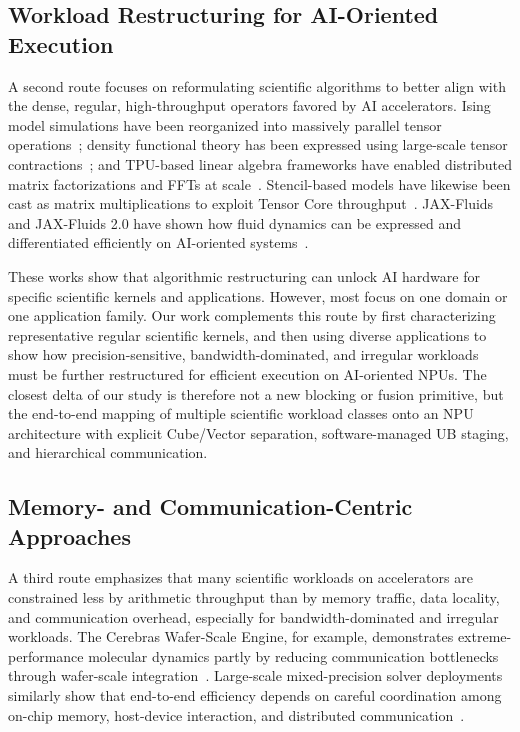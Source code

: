 \documentclass{article}
\newcommand{\rev}[1]{#1}
\begin{document}
\subsection{Workload Restructuring for AI-Oriented Execution}

A second route focuses on reformulating scientific algorithms to better align with the dense, regular, high-throughput operators favored by AI accelerators. Ising model simulations have been reorganized into massively parallel tensor operations~\cite{yang2019high}; density functional theory has been expressed using large-scale tensor contractions~\cite{pederson2023large}; and TPU-based linear algebra frameworks have enabled distributed matrix factorizations and FFTs at scale~\cite{lewis2022large}. Stencil-based models have likewise been cast as matrix multiplications to exploit Tensor Core throughput~\cite{ROMERO2020107473}. JAX-Fluids and JAX-Fluids 2.0 have shown how fluid dynamics can be expressed and differentiated efficiently on AI-oriented systems~\cite{Bezgin2023, Bezgin2025}.

These works show that algorithmic restructuring can unlock AI hardware for specific scientific kernels and applications. However, most focus on one domain or one application family. Our work complements this route by first characterizing representative regular scientific kernels, and then using diverse applications to show how precision-sensitive, bandwidth-dominated, and irregular workloads must be further restructured for efficient execution on AI-oriented NPUs. \rev{The closest delta of our study is therefore not a new blocking or fusion primitive, but the end-to-end mapping of multiple scientific workload classes onto an NPU architecture with explicit Cube/Vector separation, software-managed UB staging, and hierarchical communication.}

\subsection{Memory- and Communication-Centric Approaches}

A third route emphasizes that many scientific workloads on accelerators are constrained less by arithmetic throughput than by memory traffic, data locality, and communication overhead, especially for bandwidth-dominated and irregular workloads. The Cerebras Wafer-Scale Engine, for example, demonstrates extreme-performance molecular dynamics partly by reducing communication bottlenecks through wafer-scale integration~\cite{trifan2022intelligent}. Large-scale mixed-precision solver deployments similarly show that end-to-end efficiency depends on careful coordination among on-chip memory, host-device interaction, and distributed communication~\cite{kudo2020implementation, lu2022climbing, xue_unlocking}.
\end{document}

